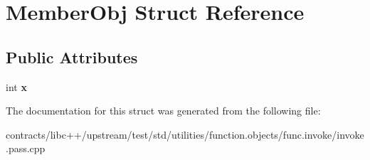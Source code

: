 \hypertarget{struct_member_obj}{}\section{Member\+Obj Struct Reference}
\label{struct_member_obj}
\subsection*{Public Attributes}
\begin{DoxyCompactItemize}
\item 
\mbox{\label{struct_member_obj_a694faea8461ad7a9254844e77b4416bd}} 
int {\bfseries x}
\end{DoxyCompactItemize}


The documentation for this struct was generated from the following file\+:\begin{DoxyCompactItemize}
\item 
contracts/libc++/upstream/test/std/utilities/function.\+objects/func.\+invoke/invoke.\+pass.\+cpp\end{DoxyCompactItemize}
